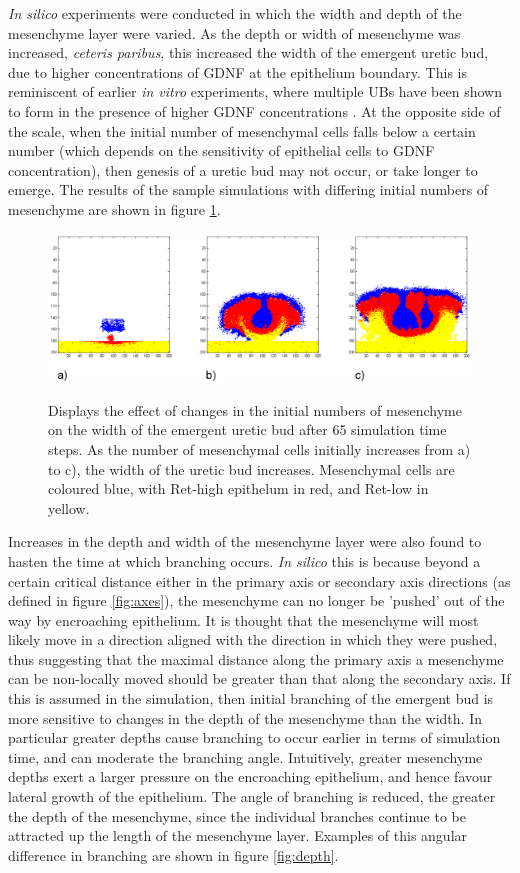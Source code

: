 \documentclass[pdftex,10pt,a4paper,twocolumn]{article}
\begin{document}
\textit{In silico} experiments were conducted in which the width and depth of the mesenchyme layer were varied. As the depth or width of mesenchyme was increased, \textit{ceteris paribus}, this increased the width of the emergent uretic bud, due to higher concentrations of GDNF at the epithelium boundary. This is reminiscent of earlier \textit{in vitro} experiments, where multiple UBs have been shown to form in the presence of higher GDNF concentrations \cite{pepicelli1997gdnf}. At the opposite side of the scale, when the initial number of mesenchymal cells falls below a certain number (which depends on the sensitivity of epithelial cells to GDNF concentration), then genesis of a uretic bud may not occur, or take longer to emerge. The results of the sample simulations with differing initial numbers of mesenchyme are shown in figure \ref{fig:initial}.

\begin{figure}[t] 
\centering
\scalebox{0.93} 
{\includegraphics{initial.eps}}
\caption{Displays the effect of changes in the initial numbers of mesenchyme on the width of the emergent uretic bud after 65 simulation time steps. As the number of mesenchymal cells initially increases from a) to c), the width of the uretic bud increases. Mesenchymal cells are coloured blue, with Ret-high epithelum in red, and Ret-low in yellow.}\label{fig:initial}
\end{figure} 

Increases in the depth and width of the mesenchyme layer were also found to hasten the time at which branching occurs. \textit{In silico} this is because beyond a certain critical distance either in the primary axis or secondary axis directions (as defined in figure \ref{fig:axes}), the mesenchyme can no longer be 'pushed' out of the way by encroaching epithelium. It is thought that the mesenchyme will most likely move in a direction aligned with the direction in which they were pushed, thus suggesting that the maximal distance along the primary axis a mesenchyme can be non-locally moved should be greater than that along the secondary axis. If this is assumed in the simulation, then initial branching of the emergent bud is more sensitive to changes in the depth of the mesenchyme than the width. In particular greater depths cause branching to occur earlier in terms of simulation time, and can moderate the branching angle. Intuitively, greater mesenchyme depths exert a larger pressure on the encroaching epithelium, and hence favour lateral growth of the epithelium. The angle of branching is reduced, the greater the depth of the mesenchyme, since the individual branches continue to be attracted up the length of the mesenchyme layer. Examples of this angular difference in branching are shown in figure \ref{fig:depth}.
\end{document}
